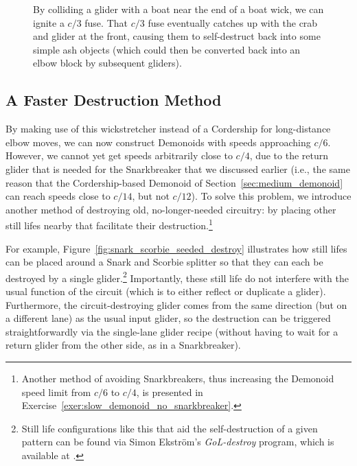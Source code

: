 \begin{figure}[!htb]
	\centering
	
	\caption{By colliding a glider with a boat near the end of a boat wick, we can ignite a $c/3$ fuse. That $c/3$ fuse eventually catches up with the crab and glider at the front, causing them to self-destruct back into some simple ash objects (which could then be converted back into an elbow block by subsequent gliders).}\label{fig:boatstretcher_shoot_down}
\end{figure}


\subsection{A Faster Destruction Method}\label{sec:fast_demonoid_faster_destruction}

By making use of this wickstretcher instead of a Cordership for long-distance elbow moves, we can now construct Demonoids with speeds approaching $c/6$. However, we cannot yet get speeds arbitrarily close to $c/4$, due to the return glider that is needed for the Snarkbreaker that we discussed earlier (i.e., the same reason that the Cordership-based Demonoid of Section~\ref{sec:medium_demonoid} can reach speeds close to $c/14$, but not $c/12$). To solve this problem, we introduce another method of destroying old, no-longer-needed circuitry: by placing other still lifes nearby that facilitate their destruction.\footnote{Another method of avoiding Snarkbreakers, thus increasing the Demonoid speed limit from $c/6$ to $c/4$, is presented in Exercise~\ref{exer:slow_demonoid_no_snarkbreaker}.}

For example, Figure~\ref{fig:snark_scorbie_seeded_destroy} illustrates how still lifes can be placed around a Snark and Scorbie splitter so that they can each be destroyed by a single glider.\footnote{Still life configurations like this that aid the self-destruction of a given pattern can be found via Simon Ekstr\"{o}m's \emph{GoL-destroy} program, which is available at .} Importantly, these still life do not interfere with the usual function of the circuit (which is to either reflect or duplicate a glider). Furthermore, the circuit-destroying glider comes from the same direction (but on a different lane) as the usual input glider, so the destruction can be triggered straightforwardly via the single-lane glider recipe (without having to wait for a return glider from the other side, as in a Snarkbreaker).


